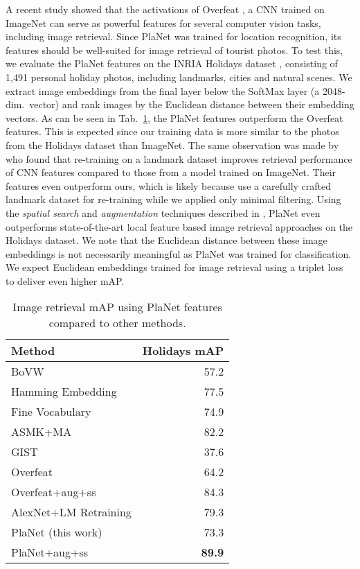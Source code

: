 \documentclass[10pt,twocolumn,letterpaper]{article}
\begin{document}
A recent study \cite{Razavian14DVW} showed that the activations of Overfeat \cite{Sermanet14ICLR}, a CNN trained on ImageNet \cite{Deng09CVPR} can serve as powerful features for several computer vision tasks, including image retrieval. Since PlaNet was trained for location recognition, its features should be well-suited for image retrieval of tourist photos.
To test this, we evaluate the PlaNet features on the INRIA Holidays dataset \cite{Jegou08ECCV}, consisting of 1,491 personal holiday photos, including landmarks, cities and natural scenes.
We extract image embeddings from the final layer below the SoftMax layer (a 2048-dim.\ vector) and rank images by the Euclidean distance between their embedding vectors.  As can be seen in Tab.~\ref{tab:retrieval_results}, the PlaNet features outperform the Overfeat features. This is expected since our training data is more similar to the photos from the Holidays dataset than ImageNet. The same observation was made by \cite{Babenko14ECCV} who found that re-training on a landmark dataset improves retrieval performance of CNN features compared to those from a model trained on ImageNet. Their features even outperform ours, which is likely because \cite{Babenko14ECCV} use a carefully crafted landmark dataset for re-training while we applied only minimal filtering.
Using the \emph{spatial search} and \emph{augmentation} techniques described in \cite{Razavian14DVW}, PlaNet even outperforms state-of-the-art local feature based image retrieval approaches on the Holidays dataset.
We note that the Euclidean distance between these image embeddings is not necessarily meaningful as PlaNet was trained for classification. We expect Euclidean embeddings trained for image retrieval using a triplet loss \cite{Wang14CVPR} to deliver even higher mAP.

\begin{table}[t]
  \centering
  \footnotesize
  \begin{tabular}{lr}
    \hline
    \textbf{Method} & \textbf{Holidays mAP} \\
    \hline
    BoVW & 57.2 \cite{Jegou10IJCV} \\
    Hamming Embedding & 77.5 \cite{Jegou10IJCV} \\
    Fine Vocabulary & 74.9 \cite{Mikulik10ECCV} \\
    ASMK+MA & 82.2  \cite{Tolias13ICCV} \\
    \hline
    GIST & 37.6 \cite{Douze09CIVR} \\
    Overfeat & 64.2 \cite{Razavian14DVW} \\
    Overfeat+aug+ss & 84.3 \cite{Razavian14DVW} \\
    AlexNet+LM Retraining & 79.3  \cite{Babenko14ECCV} \\
    \hline
    PlaNet (this work) & 73.3 \\
    PlaNet+aug+ss & \textbf{89.9} \\
    \hline
  \end{tabular}
  \caption{Image retrieval mAP using PlaNet features compared to other methods.}
  \label{tab:retrieval_results}
\end{table}
\end{document}
